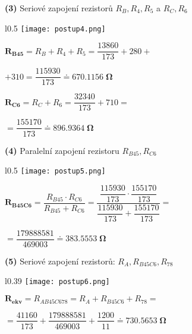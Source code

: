 \documentclass[a4paper,12pt]{article}
\begin{document}
\hspace{1em}\textbf{(3)} Seriové zapojení rezistorů $R_B, R_4, R_5$ a $R_C, R_6$\par
\begin{wrapfigure}{l}{0.5\textwidth}
\vspace{-27pt}
\texttt{[image: postup4.png]}
\vspace{-65pt}
\end{wrapfigure}
\vspace{3pt}
\hspace{1em}$\mathbf{R_{B45}}=R_B+R_4+R_5=\dfrac{13860}{173}+280+$\par\hspace{1em}$+310=\dfrac{115930}{173}\doteq \mathbf{ 670.1156 \;\si{\Omega}}$\par\hspace{1em}$\mathbf{R_{C6}}=R_C+R_6=\dfrac{32340}{173}+710=$\par\hspace{1em}$=\dfrac{155170}{173}\doteq \mathbf{ 896.9364 \;\si{\Omega}}$\par\vspace{1.8em}
\hspace{1em}\textbf{(4)} Paralelní zapojení rezistoru $R_{B45}, R_{C6}$\par
\begin{wrapfigure}{l}{0.5\textwidth}
\vspace{-46pt}
\texttt{[image: postup5.png]}
\vspace{-65pt}
\end{wrapfigure}
\vspace{25pt}
\hspace{1em}$\mathbf{R_{B45C6}}=\dfrac{R_{B45}\cdot R_{C6}}{R_{B45}+R_{C6}}=\dfrac{\dfrac{115930}{173}\cdot  \dfrac{155170}{173}}{\dfrac{115930}{173}+\dfrac{155170}{173}}=$\par\hspace{1em}$=\dfrac{179888581}{469003}\doteq \mathbf{ 383.5553 \;\si{\Omega}}$\par\vspace{2.9em}
\hspace{1em}\textbf{(5)} Seriové zapojení rezistorů: $R_A, R_{B45C6}, R_{78}$\par
\begin{wrapfigure}{l}{0.39\textwidth}
\vspace{-40pt}
\texttt{[image: postup6.png]}
\vspace{-60pt}
\end{wrapfigure}
\vspace{25pt}
\hspace{1em}$\mathbf{R_{ekv}}=R_{AB45C678}=R_A+R_{B45C6}+R_{78}=$\par\hspace{1em}$=\dfrac{41160}{173}+\dfrac{179888581}{469003}+\dfrac{1200}{11}\doteq \mathbf{ 730.5653 \;\si{\Omega}}$\par\vspace{2.6em}
\end{document}
